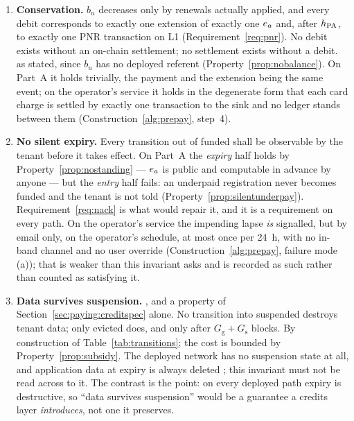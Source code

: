 \begin{enumerate}\setlength{\itemsep}{3pt}
\item\label{inv:conservation} \textbf{Conservation.} $b_u$ decreases only by renewals actually
applied, and every debit corresponds to exactly one extension of exactly one $e_{a}$ and, after
$h_{\mathrm{PA}}$, to exactly one PNR transaction on L1 (Requirement~\ref{req:pnr}). No debit exists without an
on-chain settlement; no settlement exists without a debit. \planned as stated, since $b_u$ has no
deployed referent (Property~\ref{prop:nobalance}). On Part~A it holds trivially, the payment and the
extension being the same event; on the operator's service it holds in the degenerate form that each card
charge is settled by exactly one transaction to the sink and no ledger stands between them
(Construction~\ref{alg:prepay}, step~4).

\item\label{inv:nosilent} \textbf{No silent expiry.} Every transition out of \textsf{funded} shall be
observable by the tenant before it takes effect. On Part~A the \emph{expiry} half holds by
Property~\ref{prop:nostanding} --- $e_{a}$ is public and computable in advance by anyone --- but the
\emph{entry} half fails: an underpaid registration never becomes \textsf{funded} and the tenant is
not told (Property~\ref{prop:silentunderpay}). Requirement~\ref{req:nack} is what would repair it,
and it is a requirement on every path. On the operator's service the impending lapse \emph{is} signalled,
but by email only, on the operator's schedule, at most once per \qty{24}{\hour}, with no in-band
channel and no user override (Construction~\ref{alg:prepay}, failure mode (a)); that is weaker than
this invariant asks and is recorded as such rather than counted as satisfying it.

\item\label{inv:datasurvives} \textbf{Data survives suspension.} \planned, and a property of
Section~\ref{sec:paying:creditspec} alone. No transition into \textsf{suspended} destroys tenant
data; only \textsf{evicted} does, and only after $G_{\mathrm{g}} + G_{\mathrm{s}}$ blocks. By
construction of Table~\ref{tab:transitions}; the cost is bounded by Property~\ref{prop:subsidy}. The
deployed network has no suspension state at all, and application data at expiry is always deleted
; this invariant must not be read across to it. The
contrast is the point: on every deployed path expiry is destructive, so ``data survives suspension''
would be a guarantee a credits layer \emph{introduces}, not one it preserves.


\end{enumerate}

